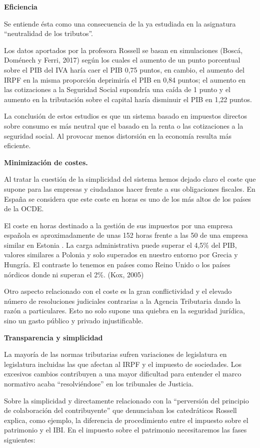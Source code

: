 \documentclass[
]{article}
\begin{document}
\textbf{Eficiencia}

Se entiende ésta como una consecuencia de la ya estudiada en la
asignatura ``neutralidad de los tributos''.

Los datos aportados por la profesora Rossell se basan en simulaciones
(Boscá, Doménech y Ferri, 2017) según los cuales el aumento de un punto
porcentual sobre el PIB del IVA haría caer el PIB 0,75 puntos, en
cambio, el aumento del IRPF en la misma proporción deprimiría el PIB en
0,84 puntos; el aumento en las cotizaciones a la Seguridad Social
supondría una caída de 1 punto y el aumento en la tributación sobre el
capital haría disminuir el PIB en 1,22 puntos.

La conclusión de estos estudios es que un sistema basado en impuestos
directos sobre consumo es más neutral que el basado en la renta o las
cotizaciones a la seguridad social. Al provocar menos distorsión en la
economía resulta más eficiente.

\textbf{Minimización de costes.}

Al tratar la cuestión de la simplicidad del sistema hemos dejado claro
el coste que supone para las empresas y ciudadanos hacer frente a sus
obligaciones fiscales. En España se considera que este coste en horas es
uno de los más altos de los países de la OCDE.

El coste en horas destinado a la gestión de sus impuestos por una
empresa española es aproximadamente de unas 152 horas frente a las 50 de
una empresa similar en Estonia . La carga administrativa puede superar
el 4,5\% del PIB, valores similares a Polonia y solo superados en
nuestro entorno por Grecia y Hungría. El contraste lo tenemos en países
como Reino Unido o los países nórdicos donde ni superan el 2\%. (Kox,
2005)

Otro aspecto relacionado con el coste es la gran conflictividad y el
elevado número de resoluciones judiciales contrarias a la Agencia
Tributaria dando la razón a particulares. Esto no solo supone una
quiebra en la seguridad jurídica, sino un gasto público y privado
injustificable.

\textbf{Transparencia y simplicidad}

La mayoría de las normas tributarias sufren variaciones de legislatura
en legislatura incluidas las que afectan al IRPF y el impuesto de
sociedades. Los excesivos cambios contribuyen a una mayor dificultad
para entender el marco normativo acaba ``resolviéndose'' en los
tribunales de Justicia.

Sobre la simplicidad y directamente relacionado con la ``perversión del
principio de colaboración del contribuyente'' que denunciaban los
catedráticos Rossell explica, como ejemplo, la diferencia de
procedimiento entre el impuesto sobre el patrimonio y el IBI. En el
impuesto sobre el patrimonio necesitaremos las fases siguientes:
\end{document}
